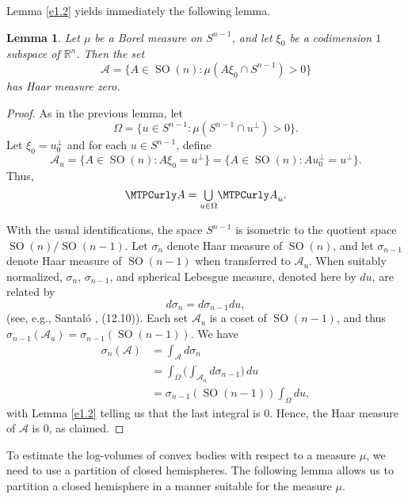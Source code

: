 \documentclass{cpamart1}     %
\newtheorem{lemm}[theo]{Lemma}
\theoremstyle{definition}
\theoremstyle{remark}
\newcommand*{\medcup}{\mathsmaller{\bigcup}}%
\newcommand{\rn}{\mathbb R^n}
\newcommand{\sn}{S^{n-1}}
\newcommand{\so}{\operatorname{SO}}
\newcommand{\son}{\so(n)}
\newcommand{\sonm}{\so(n-1)}
\begin{document}
Lemma \ref{e1.2} yields immediately the following lemma.

\begin{lemm}\label{e1a}
Let $\mu$ be a Borel measure on $S^{n-1}$,
and let $\xi_0$ be a codimension $1$ subspace of $\rn$.
Then the set
\[
\mathcal A = \{A\in \son :  \mu(A\xi_0 \cap S^{n-1})>0\}
\]
has Haar measure zero.
\end{lemm}

\begin{proof}
As in the previous lemma, let
\begin{equation*}
\Omega = \{u\in S^{n-1} : \mu(S^{n-1}\cap u^\bot)>0 \}.
\end{equation*}
Let $\xi_0=u_0^\perp$ and for each $u\in\sn$, define
\begin{equation*}
\mathcal A_u =\{A\in \son : A\xi_0 = u^\bot\}=\{A\in \son : Au_0^\perp = u^\bot\}.
\end{equation*}
Thus,
\[
\mathcal A = \medcup\limits_{u\in \Omega} \mathcal A_u.
\]


With the usual identifications, the space $S^{n-1}$ is isometric to the quotient space $\son/\sonm$.
Let $\sigma_n$ denote Haar measure of $\son$, and let $\sigma_{n-1}$ denote Haar measure of
$\sonm$ when transferred to $\mathcal A_u$.
When suitably normalized, $\sigma_n$, $\sigma_{n-1}$, and spherical
Lebesgue measure, denoted here by $du$, are related by
\[
d\sigma_n = d\sigma_{n-1} du,
\]
(see, e.g., Santal\'o \cite{Sa}, (12.10)).
Each set $\mathcal A_u$ is a coset of $\sonm$, and thus $\sigma_{n-1}(\mathcal A_u)=\sigma_{n-1}(\sonm)$.
We have
\begin{align*}
\sigma_n({\mathcal A})
&=\int_{\mathcal A} d\sigma_n\\
&= \int_\Omega \Big(\int_{\mathcal A_u} d\sigma_{n-1}\Big)\, du \\
&=\sigma_{n-1}(\sonm) \int_\Omega du,
\end{align*}
with Lemma \ref{e1.2} telling us that the last integral is $0$. Hence,
the Haar measure of $\mathcal A$ is $0$, as claimed.
\end{proof}


To estimate the log-volumes of convex bodies with respect to a measure $\mu$,
we need to use a partition of closed hemispheres.
The following lemma allows us to partition a closed hemisphere
in a manner suitable for the measure $\mu$.
\end{document}
